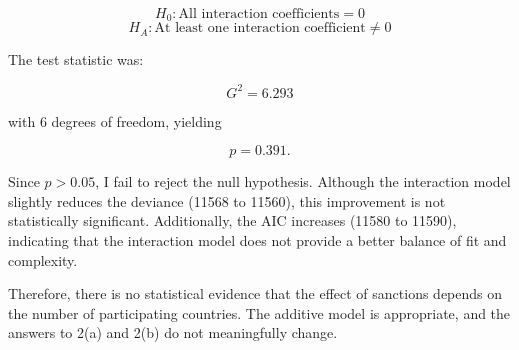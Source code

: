 \documentclass[12pt,letterpaper]{article}
\begin{document}
\[
H_0: \text{All interaction coefficients} = 0
\]
\[
H_A: \text{At least one interaction coefficient} \neq 0
\]

The test statistic was:

\[
G^2 = 6.293
\]

with 6 degrees of freedom, yielding

\[
p = 0.391.
\]

Since $p > 0.05$, I fail to reject the null hypothesis. Although the interaction model slightly reduces the deviance (11568 to 11560), this improvement is not statistically significant. Additionally, the AIC increases (11580 to 11590), indicating that the interaction model does not provide a better balance of fit and complexity.

Therefore, there is no statistical evidence that the effect of sanctions depends on the number of participating countries. The additive model is appropriate, and the answers to 2(a) and 2(b) do not meaningfully change.
\end{document}
